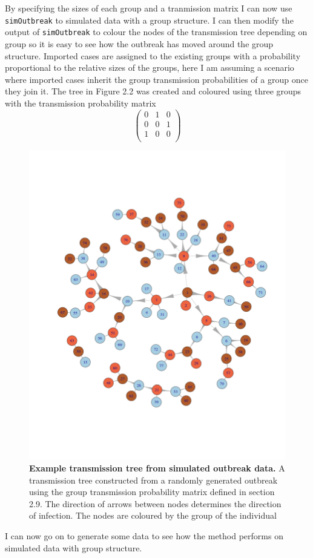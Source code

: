 \documentclass[11pt,a4paper]{report}
\begin{document}
By specifying the sizes of each group and a tranmission matrix I can now use {\tt simOutbreak} to simulated data with a group structure. I can then modify the output of {\tt simOutbreak} to colour the nodes of the transmission tree depending on group so it is easy to see how the outbreak has moved around the group structure. Imported cases are assigned to the existing groups with a probability proportional to the relative sizes of the groups, here I am assuming a scenario where imported cases inherit the group transmission probabilities of a group once they join it. The tree in Figure 2.2 was created and coloured using three groups with the transmission probability matrix
\[ \left( \begin{array}{ccc}
0 & 1 & 0 \\
0 & 0 & 1 \\
1 & 0 & 0 \\
\end{array} \right) \]
\begin{figure}[h!]
\centering 
\includegraphics[scale=0.3]{treexample.png} \newline
\caption{{\bf Example transmission tree from simulated outbreak data.} A transmission tree constructed from a randomly generated outbreak using the group transmission probability matrix defined in section 2.9. The direction of arrows between nodes determines the direction of infection. The nodes are coloured by the group of the individual}
\end{figure}
I can now go on to generate some data to see how the method performs on simulated data with group structure.
\end{document}
